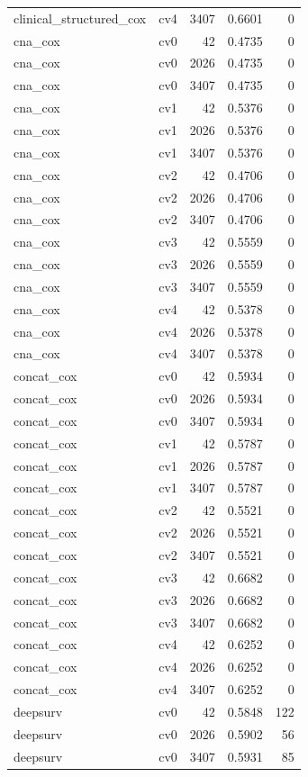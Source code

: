 \documentclass[10pt]{article}
\begin{document}
\begin{longtable}{llrrr}
clinical\_structured\_cox & cv4 & 3407 & 0.6601 & 0\\
cna\_cox & cv0 & 42 & 0.4735 & 0\\
cna\_cox & cv0 & 2026 & 0.4735 & 0\\
cna\_cox & cv0 & 3407 & 0.4735 & 0\\
cna\_cox & cv1 & 42 & 0.5376 & 0\\
cna\_cox & cv1 & 2026 & 0.5376 & 0\\
cna\_cox & cv1 & 3407 & 0.5376 & 0\\
cna\_cox & cv2 & 42 & 0.4706 & 0\\
cna\_cox & cv2 & 2026 & 0.4706 & 0\\
cna\_cox & cv2 & 3407 & 0.4706 & 0\\
cna\_cox & cv3 & 42 & 0.5559 & 0\\
cna\_cox & cv3 & 2026 & 0.5559 & 0\\
cna\_cox & cv3 & 3407 & 0.5559 & 0\\
cna\_cox & cv4 & 42 & 0.5378 & 0\\
cna\_cox & cv4 & 2026 & 0.5378 & 0\\
cna\_cox & cv4 & 3407 & 0.5378 & 0\\
concat\_cox & cv0 & 42 & 0.5934 & 0\\
concat\_cox & cv0 & 2026 & 0.5934 & 0\\
concat\_cox & cv0 & 3407 & 0.5934 & 0\\
concat\_cox & cv1 & 42 & 0.5787 & 0\\
concat\_cox & cv1 & 2026 & 0.5787 & 0\\
concat\_cox & cv1 & 3407 & 0.5787 & 0\\
concat\_cox & cv2 & 42 & 0.5521 & 0\\
concat\_cox & cv2 & 2026 & 0.5521 & 0\\
concat\_cox & cv2 & 3407 & 0.5521 & 0\\
concat\_cox & cv3 & 42 & 0.6682 & 0\\
concat\_cox & cv3 & 2026 & 0.6682 & 0\\
concat\_cox & cv3 & 3407 & 0.6682 & 0\\
concat\_cox & cv4 & 42 & 0.6252 & 0\\
concat\_cox & cv4 & 2026 & 0.6252 & 0\\
concat\_cox & cv4 & 3407 & 0.6252 & 0\\
deepsurv & cv0 & 42 & 0.5848 & 122\\
deepsurv & cv0 & 2026 & 0.5902 & 56\\
deepsurv & cv0 & 3407 & 0.5931 & 85\\

\end{longtable}
\end{document}
